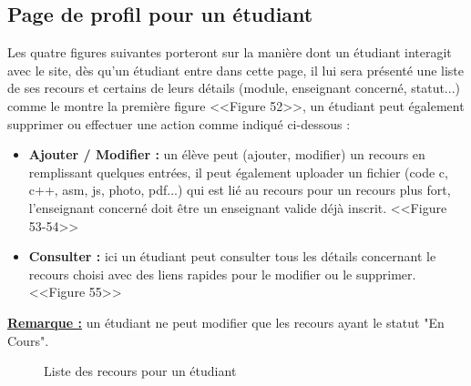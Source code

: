 \documentclass[12pt]{report}
\begin{document}
\subsection{Page de profil pour un étudiant}

Les quatre figures suivantes porteront sur la manière dont un étudiant interagit avec le site, dès qu'un étudiant entre dans cette page, il lui sera présenté une liste de ses recours et certains de leurs détails (module, enseignant concerné, statut...) comme le montre la première figure <<Figure 52>>, un étudiant peut également supprimer ou effectuer une action comme indiqué ci-dessous :

\begin{itemize}
  \item \textbf{Ajouter / Modifier :} un élève peut (ajouter, modifier) un recours en remplissant quelques entrées, il peut également uploader un fichier (code c, c++, asm, js, photo, pdf...) qui est lié au recours pour un recours plus fort, l'enseignant concerné doit être un enseignant valide déjà inscrit. <<Figure 53-54>>
  \item \textbf{Consulter :} ici un étudiant peut consulter tous les détails concernant le recours choisi avec des liens rapides pour le modifier ou le supprimer. <<Figure 55>>
\end{itemize}
\textbf{\uline{Remarque :}} un étudiant ne peut modifier que les recours ayant le statut "En Cours".

\newpage

\begin{figure}[H]
\centering
\caption{Liste des recours pour un étudiant}
\end{figure}
\end{document}
